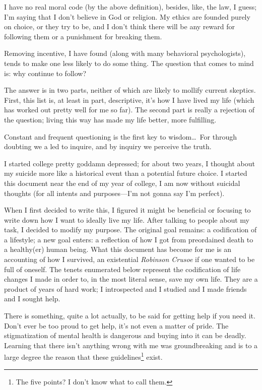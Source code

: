 \documentclass[../philo.tex]{subfiles}
\begin{document}
I have no real moral code (by the above definition), besides, like, the law, I guess; I'm saying that I don't believe in God or religion.
My ethics are founded purely on choice, or they try to be, and I don't think there will be any reward for following them or a punishment for breaking them.

Removing incentive, I have found (along with many behavioral psychologists), tends to make one less likely to do some thing.
The question that comes to mind is: why continue to follow?

The answer is in two parts, neither of which are likely to mollify current skeptics.
First, this list is, at least in part, descriptive, it's how I have lived my life (which has worked out pretty well for me so far).
The second part is really a rejection of the question; living this way has made my life better, more fulfilling.

\epigraph{Constant and frequent questioning is the first key to wisdom\ldots\ For through doubting we a led to inquire, and by inquiry we perceive the truth.}{}
I started college pretty goddamn depressed; for about two years, I thought about my suicide more like a historical event than a potential future choice.
I started this document near the end of my  year of college, I am now without suicidal thoughts (for all intents and purposes---I'm not gonna say I'm perfect).

When I first decided to write this, I figured it might be beneficial or focusing to write down how I want to ideally live my life.
After talking to people about my task, I decided to modify my purpose.
The original goal remains: a codification of a lifestyle; a new goal enters: a reflection of how I got from preordained death to a healthy(er) human being.
What this document has become for me is an accounting of how I survived, an existential \textit{Robinson Crusoe} if one wanted to be full of oneself.
The tenets enumerated below represent the codification of life changes I made in order to, in the most literal sense, save my own life.
They are a product of years of hard work; I introspected and I studied and I made friends and I sought help.

There is something, quite a lot actually, to be said for getting help if you need it.
Don't ever be too proud to get help, it's not even a matter of pride.
The stigmatization of mental health is dangerous and buying into it can be deadly.
Learning that there isn't anything wrong with me was groundbreaking and is to a large degree the reason that these guidelines\footnote{The five points? I don't know what to call them.} exist.
\end{document}
